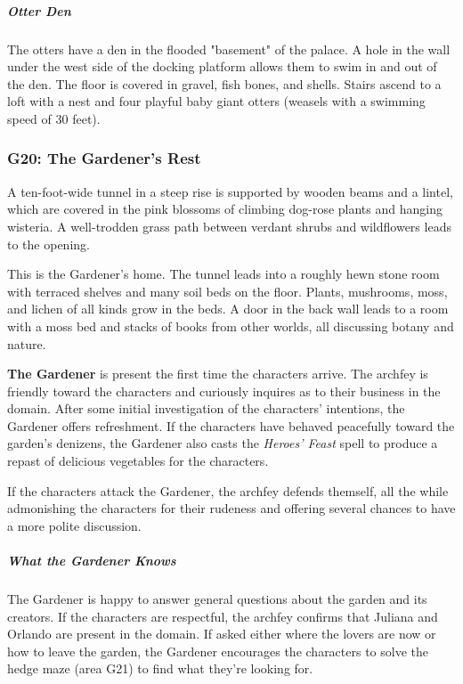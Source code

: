 \documentclass[10pt,a4paper,twoside,bg=print,twocolumn,openany,nodeprecatedcode]{dndbook}
\begin{document}
\subparagraph{Otter Den}
The otters have a den in the flooded "basement" of the palace. A hole in the wall under the west side of the docking platform allows them to swim in and out of the den. The floor is covered in gravel, fish bones, and shells. Stairs ascend to a loft with a nest and four playful baby giant otters (weasels with a swimming speed of 30 feet).

\subsubsection{G20: The Gardener's Rest}
\begin{DndReadAloud}{}
A ten-foot-wide tunnel in a steep rise is supported by wooden beams and a lintel, which are covered in the pink blossoms of climbing dog-rose plants and hanging wisteria. A well-trodden grass path between verdant shrubs and wildflowers leads to the opening.

\end{DndReadAloud}

This is the Gardener's home. The tunnel leads into a roughly hewn stone room with terraced shelves and many soil beds on the floor. Plants, mushrooms, moss, and lichen of all kinds grow in the beds. A door in the back wall leads to a room with a moss bed and stacks of books from other worlds, all discussing botany and nature.

\textbf{The Gardener} is present the first time the characters arrive. The archfey is friendly toward the characters and curiously inquires as to their business in the domain. After some initial investigation of the characters' intentions, the Gardener offers refreshment. If the characters have behaved peacefully toward the garden's denizens, the Gardener also casts the \textit{Heroes' Feast} spell to produce a repast of delicious vegetables for the characters.

If the characters attack the Gardener, the archfey defends themself, all the while admonishing the characters for their rudeness and offering several chances to have a more polite discussion.

\subparagraph{What the Gardener Knows}
The Gardener is happy to answer general questions about the garden and its creators. If the characters are respectful, the archfey confirms that Juliana and Orlando are present in the domain. If asked either where the lovers are now or how to leave the garden, the Gardener encourages the characters to solve the hedge maze (area G21) to find what they're looking for.
\end{document}
